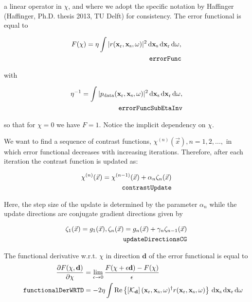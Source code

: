 \documentclass[10pt,a4paper]{article}
\newcommand{\partder}[2]{\ensuremath{\frac{\partial #1}{\partial #2}}}
\newcommand{\df}[1]{\, \ensuremath{\mbox{d}#1}}
\newcommand{\real}[1]{\text{Re} \left\{ #1 \right\}}
\newcommand{\xs}{\mathbf{x}_\text{s}}
\newcommand{\xr}{\mathbf{x}_\text{r}}
\begin{document}
a linear operator in $\chi$, and where we adopt the specific notation
by Haffinger (Haffinger, Ph.D. thesis 2013, TU Delft) for consistency.
The error functional is equal to

\begin{align} \label{eq:errorFunc} F(\chi) = \eta \int |r(\xr, \xs,
\omega)|^2 \df{\mathbf{x}_\text{s}} \df{\xr}
\df{\omega},\\
\tag*{\texttt{errorFunc}}
\end{align}

with

\begin{align} \label{eq:errorFuncSubEtaInv} \eta^{-1} = \int | p_\text{data}(\xr,
\xs, \omega) |^2 \df{\xs} \df{\xr} \df{\omega}, \\
\tag*{\texttt{errorFuncSubEtaInv}} 
 \end{align}

so that for $\chi = 0$ we have $F = 1$. Notice the implicit dependency
on $\chi$.

We want to find a sequence of contrast functions,
$\chi^{(n)}(\vec{x}), n = 1,2,...,$ in which error functional
decreases with increasing iterations. Therefore, after each iteration
the contrast function is updated as:

\begin{align} \label{eq:contrastUpdate} \chi^{(n)}(\vec{x}) =
\chi^{(n-1)}(\vec{x}) + \alpha_n\zeta_n(\vec{x})\\
\tag*{\texttt{contrastUpdate}}
\end{align}

Here, the step size of the update is determined by the parameter
$\alpha_n$ while the update directions are conjugate gradient
directions given by

\begin{align} \label{eq:updateDirectionsCG}\zeta_1(\vec{x}) = g_1(\vec{x})
,\zeta_n(\vec{x}) = g_n(\vec{x}) + \gamma_n\zeta_{n-1}(\vec{x})\\
\tag*{\texttt{updateDirectionsCG}}
\end{align}

The functional derivative w.r.t. $\chi$ in direction $\mathbf{d}$ of
the error functional is equal to
\begin{align}
\label{eq:functionalDerWRTD}
\partder{F(\mathbf{\chi}, \mathbf{d})}{\mathbf{\chi}} & =
\lim_{\epsilon \rightarrow 0} \frac{F(\mathbf{\chi} + \epsilon
\mathbf{d}) - F(\mathbf{\chi})}{\epsilon} \\
\tag*{\texttt{functionalDerWRTD}}
& = -2 \eta \int \real{\left[\mathcal{K}_\mathbf{d} \right](\xr, \xs,
\omega)^{\dagger} r (\xr, \xs, \omega)} \df{\xs} \df{\xr} \df{\omega}
\end{align}
\end{document}
